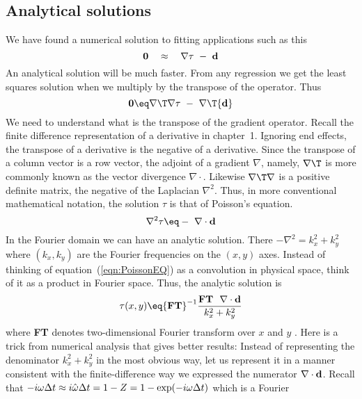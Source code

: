 
\subsection{Analytical solutions}
%
We have found a numerical solution to fitting applications such as this 
\begin{equation}
{\bf 0} \quad \approx \quad \nabla \tau \ - \ {\bf d}
\label{eqn:analyticsolution}
\end{equation}
An analytical solution will be much faster.
From any regression we get the least 
squares solution when we multiply by the transpose of the operator. Thus 
\begin{equation}
{\bf 0} \eq \nabla\T \nabla \tau \ -\ \nabla\T {\bf d}
\end{equation} 
We need to understand what is the transpose of the gradient operator.
Recall the finite difference representation of a derivative in chapter~1.
Ignoring end effects,
the transpose of a derivative is the negative of a derivative.
Since the transpose of a column vector is a row vector,
the adjoint of a gradient $\nabla$, namely,
$\nabla\T$ is more commonly known as the vector divergence 
$\nabla \cdot$.
Likewise $\nabla\T\nabla$ is a positive definite matrix,
the negative of the Laplacian $\nabla^2$.
Thus, in more conventional mathematical notation,
the solution $\tau$ is that of Poisson's equation. 
\begin{equation}
\nabla^2 \tau \eq - \ \nabla \cdot {\bf d} 
\label{eqn:PoissonEQ}
\end{equation} 
In the Fourier domain we can have an analytic solution.
There $-\nabla^2 = k_x^2 + k_y^2$ 
where $(k_x , k_y)$ are the Fourier frequencies on the $(x , y )$ axes.
Instead of thinking 
of equation~(\ref{eqn:PoissonEQ}) as a convolution in physical space,
think of it as a product in Fourier space.
Thus, the analytic solution is
\begin{equation}
\tau(x,y) \eq
{\bf FT}^{-1} \frac{ {\bf FT} \ \ \nabla \cdot {\bf d} } { k_x^2+k_y^2}
\end{equation}
where {\bf FT} denotes two-dimensional Fourier transform over $x$ and $y$ . 
Here is a trick from numerical analysis that gives better results: Instead of 
representing the denominator $k_x^2+k_y^2$ in the most obvious way, let us represent it 
in a manner consistent with the finite-difference way we expressed the numerator 
$\nabla \cdot {\bf d}$. Recall that $- i\omega \Delta t \approx i \hat{\omega} \Delta t = 1-Z = 1-{\rm exp}(-i \omega \Delta t)$ which is a Fourier 
